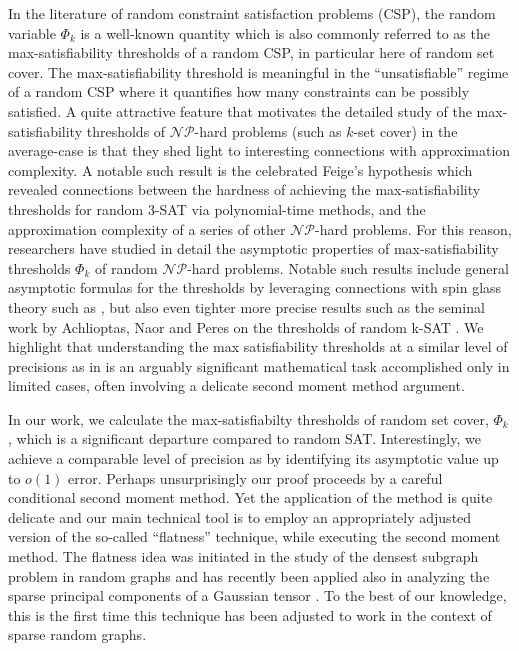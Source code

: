 \documentclass[12pt,reqno]{amsart}
\numberwithin{equation}{section}
\theoremstyle{definition}
\renewcommand{\[}{\begin{equation}}
\renewcommand{\]}{\end{equation}}
\renewcommand{\|}{\bigg{|}}
\begin{document}
In the literature of random constraint satisfaction problems (CSP), the random variable $\Phi_k$ is a well-known quantity which is also commonly referred to as the max-satisfiability thresholds of a random CSP, in particular here of random set cover. The max-satisfiability threshold is meaningful in the ``unsatisfiable'' regime of a random CSP where it quantifies how many constraints can be possibly satisfied. A quite attractive feature that motivates the detailed study of the max-satisfiability thresholds of $\mathcal{NP}$-hard problems (such as $k$-set cover) in the average-case is that they shed light to interesting connections with approximation complexity. A notable such result is the celebrated Feige's hypothesis \cite{feige2002relations} which revealed connections between the hardness of achieving the max-satisfiability thresholds for random 3-SAT via polynomial-time methods, and the approximation complexity of a series of other $\mathcal{NP}$-hard problems. For this reason, researchers have studied in detail the asymptotic properties of max-satisfiability thresholds $\Phi_k$ of random $\mathcal{NP}$-hard problems. Notable such results include general asymptotic formulas for the thresholds by leveraging connections with spin glass theory such as \cite{sen2018optimization, panchenko2018k,jones2022random}, but also even tighter more precise results such as the seminal work by Achlioptas, Naor and Peres on the thresholds of random k-SAT \cite{achlioptas2007maximum}. We highlight that understanding the max satisfiability thresholds at a similar level of precisions as in \cite{achlioptas2007maximum} is an arguably significant mathematical task accomplished only in limited cases, often involving a delicate second moment method argument.


In our work, we calculate the max-satisfiabilty thresholds of random set cover, $\Phi_k$,  which is a significant departure compared to random SAT. Interestingly, we achieve a comparable level of precision as \cite{achlioptas2007maximum} by identifying its asymptotic value up to $o(1)$ error. Perhaps unsurprisingly our proof proceeds by a careful conditional second moment method. Yet the application of the method is quite delicate and our main technical tool is to employ an appropriately adjusted version of the so-called ``flatness'' technique, while executing the second moment method. The flatness idea was initiated in the study of the densest subgraph problem in random graphs \cite{balister2018dense,gamarnik2024overlap} and has recently been applied also in analyzing the sparse principal components of a Gaussian tensor \cite{chen2024low}. To the best of our knowledge, this is the first time this technique has been adjusted to work in the context of sparse random graphs.
\end{document}

